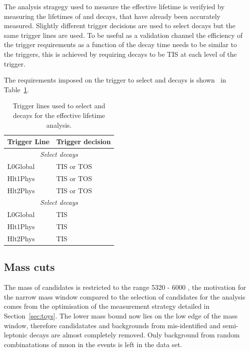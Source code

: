 The analysis stragegy used to measure the \bsmumu effective lifetime is verifyied by measuring the lifetimes of \bdkpi and \bskk decays, that have already been accurately measured. Slightly different trigger decisions are used to select \bhh decays but the same trigger lines are used. To be useful as a validation channel the efficiency of the trigger requirements as a function of the decay time needs to be similar to the \bsmumu triggers, this is achieved by requiring \bhh decays to be TIS at each level of the trigger.

The requirements imposed on the trigger to select \bsmumu and \bhh decays is shown \
in Table~\ref{tab:ELtriggers}.

\begin{table}[htbp]
\begin{center}
\begin{tabular}{ll}
\hline
Trigger Line    & Trigger decision \\ \hline
\multicolumn{2}{c}{{\it Select \bsmumu decays}} \\ \hline
L0Global        & TIS or TOS \\
Hlt1Phys        & TIS or TOS \\
Hlt2Phys        & TIS or TOS \\ \hline
\multicolumn{2}{c}{{\it Select \bhh decays}} \\ \hline
L0Global        & TIS\\
Hlt1Phys        & TIS \\
Hlt2Phys        & TIS \\ \hline
\end{tabular}
\vspace{0.7cm}
\caption{Trigger lines used to select \bsmumu and \bhh decays for the \bsmumu effective lifetime analysis.}
\label{tab:ELtriggers}
\end{center}
\vspace{-1.0cm}
\end{table}


\subsection{Mass cuts}
\label{sec:ELmass}
The mass of \bsmumu candidates is restricted to the range 5320 - 6000 \mevcc, the motivation for the narrow mass window compared to the selection of candidates for the \BF analysis comes from the optimisation of the measurement strategy detailed in Section~\ref{sec:toys}. The lower mass bound now lies on the low edge of the \bs mass window, therefore \bdmumu candidatates and backgrounds from mis-identified \bhh and semi-leptonic decays are almost completely removed. Only background from random combinatations of muon in the events is left in the data set.  

